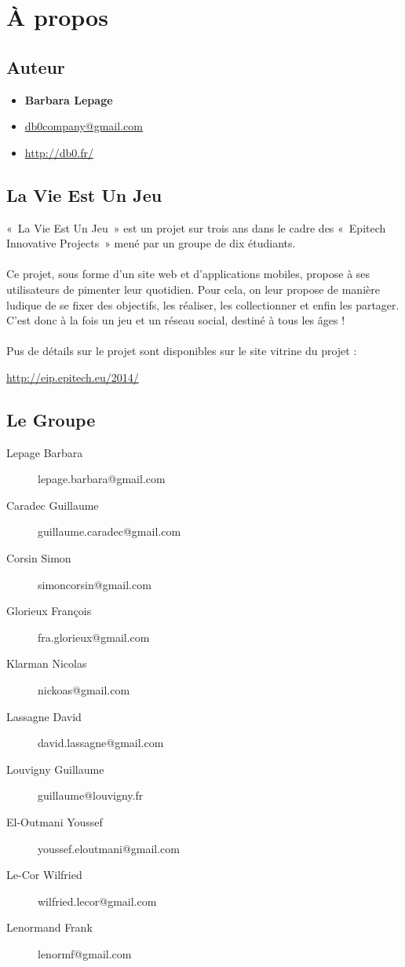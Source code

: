 \documentclass{life-fr}
\begin{document}
\chapter{À propos}

\section{Auteur}

\begin{itemize}
  \item \textbf{Barbara Lepage}
  \item \href{mailto:db0company@gmail.com}{db0company@gmail.com}
  \item \url{http://db0.fr/}
\end{itemize}

\section{La Vie Est Un Jeu}

«~La Vie Est Un Jeu~» est un projet sur trois ans dans le cadre des «~Epitech
Innovative Projects~» mené par un groupe de dix étudiants.\\
\\
Ce projet, sous forme d’un site web et d’applications mobiles, propose à ses
utilisateurs de pimenter leur quotidien. Pour cela, on leur propose de manière
ludique de se fixer des objectifs, les réaliser, les collectionner et enfin les
partager.\\
C’est donc à la fois un jeu et un réseau social, destiné à tous les âges !\\
\\
Pus de détails sur le projet sont disponibles sur le site vitrine du projet :\\
\begin{center}
  \url{http://eip.epitech.eu/2014/}
\end{center}

\newpage

\section{Le Groupe}

\begin{description}
  \item[Lepage Barbara] lepage.barbara@gmail.com
  \item[Caradec Guillaume] guillaume.caradec@gmail.com
  \item[Corsin Simon] simoncorsin@gmail.com
  \item[Glorieux François] fra.glorieux@gmail.com
  \item[Klarman Nicolas] nickoas@gmail.com
  \item[Lassagne David] david.lassagne@gmail.com
  \item[Louvigny Guillaume] guillaume@louvigny.fr
  \item[El-Outmani Youssef] youssef.eloutmani@gmail.com
  \item[Le-Cor Wilfried] wilfried.lecor@gmail.com
  \item[Lenormand Frank] lenormf@gmail.com
\end{description}
\end{document}
